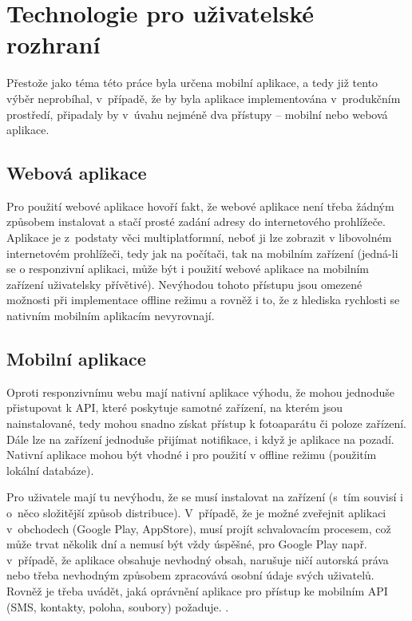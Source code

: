 \documentclass[twoside]{ctuthesis}
\begin{document}
\section{Technologie pro uživatelské rozhraní}

Přestože jako téma této práce byla určena mobilní aplikace, a tedy již tento výběr neprobíhal, v~případě, že by byla aplikace implementována v~produkčním prostředí, připadaly by v~úvahu nejméně dva přístupy -- mobilní nebo webová aplikace.

\subsection{Webová aplikace}
Pro použití webové aplikace hovoří fakt, že webové aplikace není třeba žádným způsobem instalovat a stačí prosté zadání adresy do internetového prohlížeče. Aplikace je z~podstaty věci multiplatformní, neboť ji lze zobrazit v libovolném internetovém prohlížeči, tedy jak na počítači, tak na mobilním zařízení (jedná-li se o responzivní aplikaci, může být i použití webové aplikace na mobilním zařízení uživatelsky přívětivé). Nevýhodou tohoto přístupu jsou omezené možnosti při implementace offline režimu a rovněž i to, že z hlediska rychlosti se nativním mobilním aplikacím nevyrovnají.


\subsection{Mobilní aplikace}

Oproti responzivnímu webu mají nativní aplikace výhodu, že mohou jednoduše přistupovat k API, které poskytuje samotné zařízení, na kterém jsou nainstalované, tedy mohou snadno získat přístup k fotoaparátu či poloze zařízení. Dále lze na zařízení jednoduše přijímat notifikace, i když je aplikace na pozadí. Nativní aplikace mohou být vhodné i pro použití v offline režimu (použitím lokální databáze).

Pro uživatele mají tu nevýhodu, že se musí instalovat na zařízení (s~tím souvisí i o~něco složitější způsob distribuce). V~případě, že je možné zveřejnit aplikaci v~obchodech (Google Play, AppStore), musí projít schvalovacím procesem, což může trvat několik dní a nemusí být vždy úspěšné, pro Google Play např. v~případě, že aplikace obsahuje nevhodný obsah, narušuje ničí autorská práva nebo třeba nevhodným způsobem zpracovává osobní údaje svých uživatelů. Rovněž je třeba uvádět, jaká oprávnění aplikace pro přístup ke mobilním API (SMS, kontakty, poloha, soubory) požaduje. \cite{google2021policy}.
\end{document}
